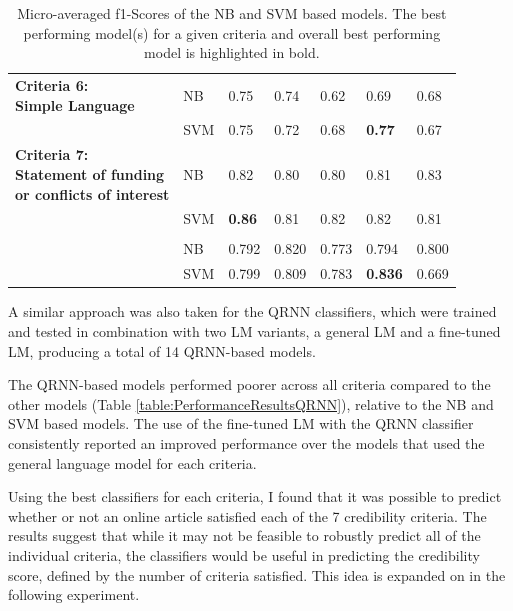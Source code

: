 \documentclass[a4paper,twoside,phd]{BYUPhys}
\begin{document}
\begin{table}[H]
{\begin{tabular}{|p{6cm}|p{2.6cm}|p{2.6cm}|p{2.6cm}|p{2.6cm}|p{2.6cm}|p{2.6cm}|}
			
			\multirowcell{2}{\textbf{Criteria 6:} \\ \textbf{Simple Language}} & NB & 0.75 & 0.74 & 0.62 & 0.69 & 0.68 \\ 
			& SVM & 0.75 & 0.72 & 0.68 & \textbf{0.77} & 0.67 \\
			\hline 
			
			
			\multirowcell{3}{\textbf{Criteria 7:} \\ \textbf{Statement of funding} \\ \textbf{or conflicts of interest}} 
			& NB & 0.82 & 0.80 & 0.80 & 0.81 & 0.83 \\ 
			& SVM & \textbf{0.86} & 0.81 & 0.82 & 0.82 & 0.81 \\ & & & & & & \\ 
			\hline 
			
			
			\multirowcell{2}{\textbf{Average} \textbf{Performance}} & NB & 0.792 & 0.820 & 0.773 & 0.794 & 0.800      \\ 
			& SVM & 0.799 & 0.809 & 0.783 & \textbf{0.836} & 0.669      \\
			\hline                                                                                                                                          
	\end{tabular}}
	\caption{Micro-averaged f1-Scores of the NB and SVM based models. The best performing model(s) for a given criteria and overall best performing model is highlighted in bold.}
	\label{table:PerformanceResultsNBSVM}
\end{table}

A similar approach was also taken for the QRNN classifiers, which were trained and tested in combination with two LM variants, a general LM and a fine-tuned LM, producing a total of 14 QRNN-based models. \newline

The QRNN-based models performed poorer across all criteria compared to the other models (Table \ref{table:PerformanceResultsQRNN}), relative to the NB and SVM based models. The use of the fine-tuned LM with the QRNN classifier consistently reported an improved performance over the models that used the general language model for each criteria. \newline

Using the best classifiers for each criteria, I found that it was possible to predict whether or not an online article satisfied each of the 7 credibility criteria. The results suggest that while it may not be feasible to robustly predict all of the individual criteria, the classifiers would be useful in predicting the credibility score, defined by the number of criteria satisfied. This idea is expanded on in the following experiment.
\end{document}
